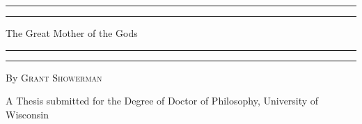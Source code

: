 \documentclass[a4paper, 11pt, oneside, polutonikogreek, english]{article}
\begin{document}
\renewcommand{\thefigure}{\Fontauri{\arabic{figure}}}
\renewcommand\thefootnote{\Fontauri{\arabic{footnote}}}
\let\oldfootnote\footnote
    \renewcommand{\footnote}[1]{\oldfootnote{\Fontauri\large#1}}
\begin{titlepage} %
	\centering %
	\scshape %

	
	\rule{\textwidth}{1.6pt}\vspace*{-\baselineskip}\vspace*{2pt} %
	\rule{\textwidth}{0.4pt} %
	
	\vspace{0.75\baselineskip} %

        {\Huge The Great Mother of the Gods \\} %
	
	\vspace{0.75\baselineskip} %
	
	\rule{\textwidth}{0.4pt}\vspace*{-\baselineskip}\vspace{3.2pt} %
	\rule{\textwidth}{1.6pt} %
	
	\vspace{1\baselineskip} %
	
	
	{By \scshape\Large Grant Showerman\\} %
	
	\vspace*{1\baselineskip} %
	
	
	\vspace{1\baselineskip} %

        {\small A Thesis submitted for the Degree of Doctor of Philosophy, University of Wisconsin}

	

\end{titlepage}
\end{document}
